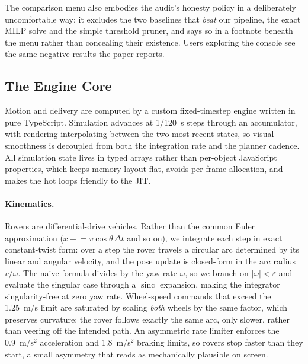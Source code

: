 The comparison menu also embodies the audit's honesty policy in a
deliberately uncomfortable way: it excludes the two baselines that
\emph{beat} our pipeline, the exact MILP solve and the simple threshold
pruner, and says so in a footnote beneath the menu rather than concealing
their existence. Users exploring the console see the same negative results
the paper reports.


\subsection{The Engine Core}

Motion and delivery are computed by a custom fixed-timestep engine written
in pure TypeScript. Simulation advances at 1/120~s steps through an
accumulator, with rendering interpolating between the two most recent
states, so visual smoothness is decoupled from both the integration rate
and the planner cadence. All simulation state lives in typed arrays rather
than per-object JavaScript properties, which keeps memory layout flat,
avoids per-frame allocation, and makes the hot loops friendly to the JIT.

\paragraph{Kinematics.}
Rovers are differential-drive vehicles. Rather than the common Euler
approximation ($x \mathrel{+}= v\cos\theta\,\Delta t$ and so on), we
integrate each step in exact constant-twist form: over a step the rover
travels a circular arc determined by its linear and angular velocity, and
the pose update is closed-form in the arc radius $v/\omega$. The naive
formula divides by the yaw rate $\omega$, so we branch on
$|\omega| < \varepsilon$ and evaluate the singular case through a
$\operatorname{sinc}$ expansion, making the integrator singularity-free at
zero yaw rate. Wheel-speed commands that exceed the 1.25~m/s limit are
saturated by scaling \emph{both} wheels by the same factor, which
preserves curvature: the rover follows exactly the same arc, only slower,
rather than veering off the intended path. An asymmetric rate limiter
enforces the 0.9~m/s$^2$ acceleration and 1.8~m/s$^2$ braking limits, so
rovers stop faster than they start, a small asymmetry that reads as
mechanically plausible on screen.

